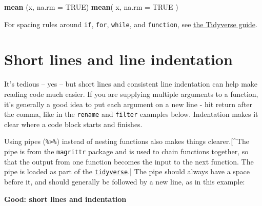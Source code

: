 \documentclass[]{book}
\newenvironment{Shaded}{\begin{snugshade}}{\end{snugshade}}
\newcommand{\DataTypeTok}[1]{\textcolor[rgb]{0.13,0.29,0.53}{#1}}
\newcommand{\DecValTok}[1]{\textcolor[rgb]{0.00,0.00,0.81}{#1}}
\newcommand{\KeywordTok}[1]{\textcolor[rgb]{0.13,0.29,0.53}{\textbf{#1}}}
\newcommand{\NormalTok}[1]{#1}
\newcommand{\OperatorTok}[1]{\textcolor[rgb]{0.81,0.36,0.00}{\textbf{#1}}}
\newcommand{\OtherTok}[1]{\textcolor[rgb]{0.56,0.35,0.01}{#1}}
\newcommand{\StringTok}[1]{\textcolor[rgb]{0.31,0.60,0.02}{#1}}
\begin{document}
\begin{Shaded}
\begin{Highlighting}[]
\KeywordTok{mean}\NormalTok{ (x, }\DataTypeTok{na.rm =} \OtherTok{TRUE}\NormalTok{)}
\KeywordTok{mean}\NormalTok{( x, }\DataTypeTok{na.rm =} \OtherTok{TRUE}\NormalTok{ )}
\end{Highlighting}
\end{Shaded}

For spacing rules around \texttt{if}, \texttt{for}, \texttt{while}, and \texttt{function}, see \href{https://style.tidyverse.org/syntax.html\#parentheses}{the Tidyverse guide}.

\hypertarget{short-lines-and-line-indentation}{%
\section{Short lines and line indentation}\label{short-lines-and-line-indentation}}

It's tedious -- yes -- but short lines and consistent line indentation can help make reading code much easier. If you are supplying multiple arguments to a function, it's generally a good idea to put each argument on a new line - hit return after the comma, like in the \texttt{rename} and \texttt{filter} examples below. Indentation makes it clear where a code block starts and finishes.

Using pipes (\texttt{\%\textgreater{}\%}) instead of nesting functions also makes things clearer.{[}\^{}The pipe is from the \texttt{magrittr} package and is used to chain functions together, so that the output from one function becomes the input to the next function. The pipe is loaded as part of the \protect\hyperlink{tidyverse}{\texttt{tidyverse}}.{]} The pipe should always have a space before it, and should generally be followed by a new line, as in this example:

\textbf{Good: short lines and indentation}

\begin{Shaded}
\end{Shaded}
\end{document}
